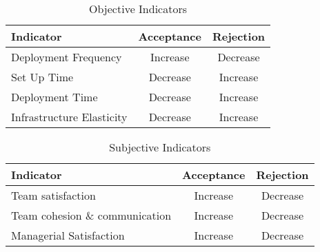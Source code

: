 		\begin{table}[h!]
			\centering
            \caption{Objective Indicators}
			\label{tab1}
			\begin{tabular}{|l|c|c|}
               	\hline
 				Indicator & Acceptance & Rejection  \\ \hline
 				Deployment Frequency & Increase  & Decrease   \\ \hline
 				Set Up Time & Decrease &  Increase  \\ \hline
 				Deployment Time & Decrease &  Increase  \\ \hline
 				Infrastructure Elasticity & Decrease & Increase \\ \hline 
			\end{tabular}
		\end{table}



		\begin{table}[h!]
			\centering
            \caption{Subjective Indicators}
			\label{tab2}
				\begin{tabular}{|l|c|c|}
                	\hline
 					Indicator & Acceptance & Rejection  \\ \hline
 					Team satisfaction & Increase  & Decrease   \\ \hline
 					Team cohesion \& communication & Increase  & Decrease   \\ \hline
 					Managerial Satisfaction & Increase &  Decrease  \\ \hline
				\end{tabular}
			\end{table}

		